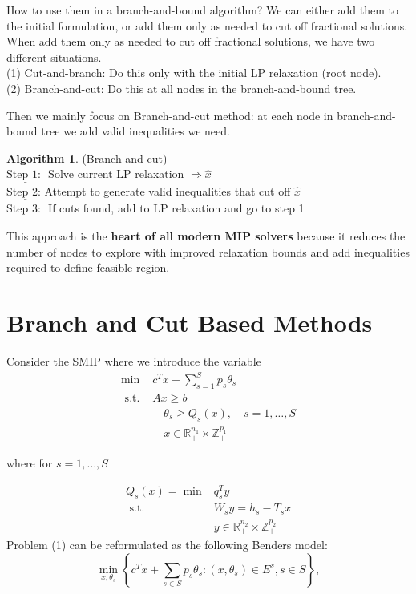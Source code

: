 \documentclass{article}
\theoremstyle{plain}
\theoremstyle{definition}
\newtheorem{algorithm}[theorem]{Algorithm}
\begin{document}
How to use them in a branch-and-bound algorithm? We can either add them to the initial formulation, or add them only as needed to cut off fractional solutions.  When add them only as needed to cut off fractional solutions, we have two different situations. \\
\indent (1) Cut-and-branch: Do this only with the initial LP relaxation (root node). \\
\indent (2) Branch-and-cut: Do this at all nodes in the branch-and-bound tree. 

Then we mainly focus on  Branch-and-cut method: at each node in branch-and-bound tree we add valid inequalities we need. \\

\begin{algorithm}(Branch-and-cut)\\
$ \underline{\text {Step 1: }}$ Solve current LP relaxation  $\Rightarrow \hat{x} $ \\
$ \underline{\text {Step 2: }}$Attempt to generate valid inequalities that cut off  $\hat{x} $ \\
$ \underline{\text {Step 3: }}$ If cuts found, add to LP relaxation and go to step 1 \\
\end{algorithm}
This approach is the \textbf{heart of all modern MIP solvers} because it reduces the number of nodes to explore with improved relaxation bounds and add inequalities required to define feasible region.
\section{Branch and Cut Based Methods}
Consider the SMIP where we introduce the variable 
\begin{equation}
\begin{array}{ll}
\min & c^{T} x+\sum_{s=1}^{S} p_{s} \theta_{s} \\
\text { s.t. } & A x \geq b \\
& \quad \theta_{s} \geq Q_{s}(x), \quad s=1, \ldots, S \\
& \quad x \in \mathbb{R}_{+}^{n_{1}} \times \mathbb{Z}_{+}^{p_{1}}
\end{array}
\end{equation}

where for  $s=1, \ldots, S $

\begin{equation}
\begin{aligned}
Q_{s}(x)=\min & q_{s}^{T} y \\
\text { s.t. } & W_{s} y=h_{s}-T_{s} x \\
& y \in \mathbb{R}_{+}^{n_{2}} \times \mathbb{Z}_{+}^{p_{2}}
\end{aligned}
\end{equation}
Problem (1) can be reformulated as the following Benders model:
$$\min _{x, \theta_{s}}\left\{c^{T} x+\sum_{s \in S} p_{s} \theta_{s}:\left(x, \theta_{s}\right) \in E^{s}, s \in S\right\},$$
\end{document}

